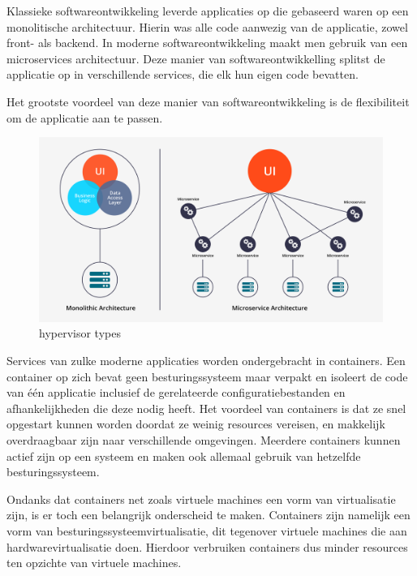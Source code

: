 Klassieke softwareontwikkeling leverde applicaties op die gebaseerd waren op een monolitische architectuur. Hierin was alle code aanwezig van de applicatie, zowel front- als backend. 
In moderne softwareontwikkeling maakt men gebruik van een microservices architectuur. Deze manier van softwareontwikkelling splitst de applicatie op in verschillende services, die elk hun eigen code bevatten.

Het grootste voordeel van deze manier van softwareontwikkeling is de flexibiliteit om de applicatie aan te passen.  

\begin{figure}[h]
    \centering
    \includegraphics[scale=.1]{img/monolithic_vs_microservices.png}
    \caption{hypervisor types \autocite{Sanjaya2020}}
    \label{fig}
\end{figure}

Services van zulke moderne applicaties worden ondergebracht in containers. Een container op zich bevat geen besturingssysteem maar verpakt en isoleert de code van één applicatie inclusief de gerelateerde configuratiebestanden en afhankelijkheden die deze nodig heeft. Het voordeel van containers is dat ze snel opgestart kunnen worden doordat ze weinig resources vereisen, en makkelijk overdraagbaar zijn naar verschillende omgevingen. Meerdere containers kunnen actief zijn op een systeem en maken ook allemaal gebruik van hetzelfde besturingssysteem. \autocite{Singh2020}

Ondanks dat containers net zoals virtuele machines een vorm van virtualisatie zijn, is er toch een belangrijk onderscheid te maken. Containers zijn namelijk een vorm van besturingssysteemvirtualisatie, dit tegenover virtuele machines die aan hardwarevirtualisatie doen.
Hierdoor verbruiken containers dus minder resources ten opzichte van virtuele machines. \autocite{Holt2018}

